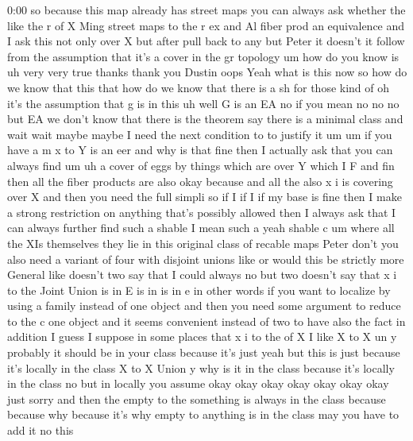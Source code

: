 \begin{unfinished}{0:00}
so  because  this  map  already  has  street
maps  you  can  always  ask  whether  the  like
the  r  of  X  Ming  street  maps  to  the  r  ex
and  Al  fiber  prod  an  equivalence  and  I
ask  this  not  only  over  X  but  after  pull
back  to  any
but  Peter  it  doesn't  it  follow  from  the
assumption  that  it's  a  cover  in  the  gr
topology
um  how  do  you  know  is
uh  very  very  true
thanks  thank  you  Dustin
oops
Yeah  what  is  this
now
so  how  do  we  know  that
this  that  how  do  we  know  that  there  is  a
sh  for  those  kind  of  oh  it's  the
assumption  that  g  is  in  this  uh
well  G  is  an
EA  no  if  you  mean  no  no  no  but  EA  we
don't  know  that  there  is  the  theorem  say
there  is  a  minimal  class  and  wait  wait
maybe  maybe  I  need  the  next  condition  to
to  justify  it
um
um  if  you  have  a  m  x  to  Y  is  an
eer  and  why  is  that
fine  then  I  actually  ask  that  you  can
always  find
um  uh  a  cover  of  eggs  by  things  which
are  over  Y  which  I
F  and  fin  then  all  the  fiber  products
are  also
okay
because  and  all
the
also
x
i  is  covering  over  X  and  then  you  need
the  full
simpli  so  if  I  if  I  if  my  base  is  fine
then  I  make  a  strong  restriction  on
anything  that's  possibly  allowed  then  I
always  ask  that  I  can  always  further
find  such  a  shable  I  mean  such  a  yeah
shable  c
um  where  all  the  XIs  themselves  they  lie
in  this  original  class  of  recable
maps  Peter  don't  you  also  need  a  variant
of  four  with  disjoint  unions
like
or  would  this  be  strictly  more  General
like  doesn't  two  say  that  I  could
always  no  but  two  doesn't  say  that  x  i
to  the  Joint  Union  is  in
E  is  in  is  in
e  in  other  words  if  you  want  to
localize  by  using  a  family  instead  of
one  object  and  then  you  need  some
argument  to  reduce  to  the  c  one  object
and  it  seems  convenient  instead  of  two
to  have  also  the  fact  in  addition  I
guess  I  suppose  in  some  places  that  x  i
to  the  of  X  I  like  X  to  X  un  y  probably
it  should  be  in  your  class  because  it's
just  yeah  but  this  is  just  because  it's
locally  in  the
class  X  to  X  Union  y  why  is  it  in  the
class  because  it's  locally  in  the  class
no  but  in  locally  you
assume  okay  okay  okay  okay  okay  okay
okay
just  sorry  and  then  the  empty  to  the
something  is  always  in  the  class
because  because
why  because
it's  why  empty  to  anything  is  in  the
class  may  you  have  to  add  it  no  this

\end{unfinished}

